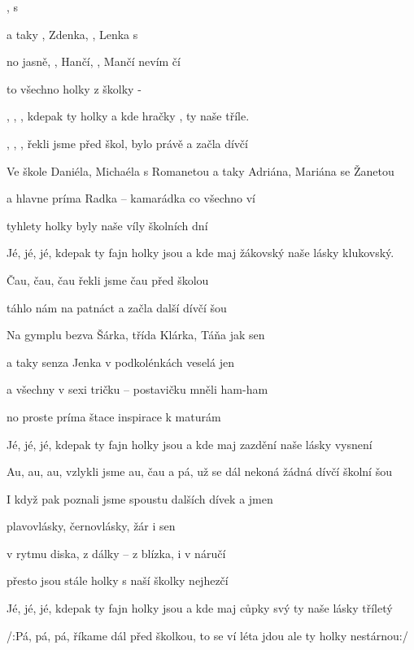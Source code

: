 

\zs
{},  s 

a taky , Zdenka, , Lenka s 

no jasně, , Hančí, , Mančí  nevím čí

to všechno  holky z  školky - 
\ks

\zr
{}, , ,
kdepak ty  holky 
a kde  hračky ,
ty naše  tříle.

, , ,
řekli jsme  před škol,
bylo  právě 
a začla  dívčí 
\kr

\zs
Ve škole Daniéla, Michaéla s Romanetou
a taky Adriána, Mariána se Žanetou

a hlavne príma Radka -- kamarádka co všechno ví

tyhlety holky byly naše víly školních dní
\ks

\zr
Jé, jé, jé,
kdepak ty fajn holky jsou
a kde maj žákovský
naše lásky klukovský.

Čau, čau, čau
řekli jsme čau před školou

táhlo nám na patnáct
a začla další dívčí šou
\kr

\zs
Na gymplu bezva Šárka, třída Klárka, Táňa jak sen

a taky senza Jenka v podkolénkách veselá jen

a všechny v sexi tričku -- postavičku mněli ham-ham

no proste príma štace inspirace k maturám
\ks

\zr
Jé, jé, jé,
kdepak ty fajn holky jsou
a kde maj zazdění
naše lásky vysnení

Au, au, au,
vzlykli jsme au, čau a pá,
už se dál nekoná
žádná dívčí školní šou
\kr

\zs
I když pak poznali jsme spoustu dalších dívek a jmen

plavovlásky, černovlásky, žár i sen

v rytmu diska, z dálky -- z blízka, i v náručí

přesto jsou stále holky s naší školky nejhezčí
\ks

\zr
Jé, jé, jé,
kdepak ty fajn holky jsou
a kde maj cůpky svý
ty naše lásky tříletý

/:Pá, pá, pá,
říkame dál před školkou,
to se ví léta jdou
ale ty holky nestárnou:/
\kr

\kp






















